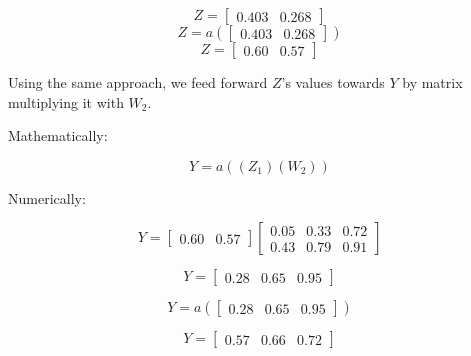 \documentclass[a4paper]{article}
\begin{document}
\begin{equation}
  Z=\begin{bmatrix}
      0.403 & 0.268
    \end{bmatrix}
\end{equation}
\begin{equation}
  Z=a(\begin{bmatrix}
      0.403 & 0.268
    \end{bmatrix})
\end{equation}
\begin{equation}
  Z=\begin{bmatrix}
      0.60 & 0.57
    \end{bmatrix}
\end{equation}

Using the same approach, we feed forward $Z$'s values towards $Y$ by matrix multiplying it with $W_{2}$. 

Mathematically:

\begin{equation}
  Y=a((Z_{1})(W_{2}))
\end{equation}

Numerically:

\begin{equation}
  Y=\begin{bmatrix}
      0.60 & 0.57
    \end{bmatrix}
    \begin{bmatrix}
      0.05 & 0.33 & 0.72 \\
      0.43 & 0.79 & 0.91
    \end{bmatrix}
\end{equation}

\begin{equation}
  Y=\begin{bmatrix}
      0.28 & 0.65 & 0.95
    \end{bmatrix}
\end{equation}

\begin{equation}
  Y=a(\begin{bmatrix}
      0.28 & 0.65 & 0.95
    \end{bmatrix})
\end{equation}

\begin{equation}
  Y=\begin{bmatrix}
      0.57 & 0.66 & 0.72
    \end{bmatrix}
\end{equation}
\end{document}
